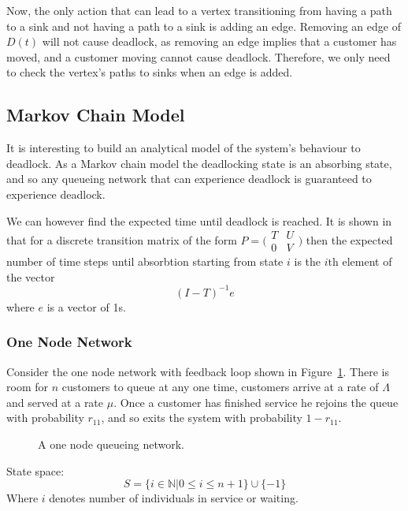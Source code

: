 \documentclass{article}
\begin{document}
Now, the only action that can lead to a vertex transitioning from having a path to a sink and not having a path to a sink is adding an edge.
Removing an edge of $D(t)$ will not cause deadlock, as removing an edge implies that a customer has moved, and a customer moving cannot cause deadlock.
Therefore, we only need to check the vertex's paths to sinks when an edge is added.

\subsection{Markov Chain Model}

It is interesting to build an analytical model of the system's behaviour to deadlock.
As a Markov chain model the deadlocking state is an absorbing state, and so any queueing network that can experience deadlock is guaranteed to experience deadlock.

We can however find the expected time until deadlock is reached.
It is shown in \cite{stewart09} that for a discrete transition matrix of the form $P = \bigl(\begin{smallmatrix} T & U\\ 0 & V \end{smallmatrix} \bigr)$ then the expected number of time steps until absorbtion starting from state $i$ is the $i\text{th}$ element of the vector
\begin{equation}
  (I - T)^{-1}e
\end{equation}
where $e$ is a vector of 1s.  %

\subsubsection{One Node Network}
Consider the one node network with feedback loop shown in Figure~\ref{fig:queueingnetwork_1node}.
There is room for $n$ customers to queue at any one time, customers arrive at a rate of $\Lambda$ and served at a rate $\mu$.
Once a customer has finished service he rejoins the queue with probability $r_{11}$, and so exits the system with probability $1 - r_{11}$.

\begin{figure}[H]
  
  \caption{A one node queueing network.}
  \label{fig:queueingnetwork_1node}
\end{figure}

State space:
        \[S = \{i\in\mathbb{N}| 0 \leq i \leq n + 1
        \}\cup\{-1\}\]
Where \(i\) denotes number of individuals in service or waiting.
\end{document}
